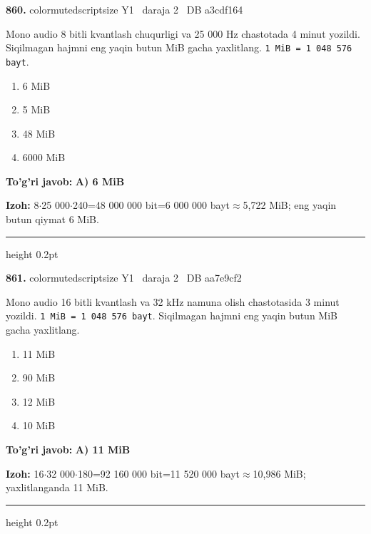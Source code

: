 \documentclass[10pt,a4paper,oneside]{article}
\begin{document}
\noindent\textbf{\color{ink}860.}  {color{muted}scriptsize Y1 \textbullet\ daraja 2 \textbullet\ DB a3cdf164}
\par
Mono audio 8 bitli kvantlash chuqurligi va 25 000 Hz chastotada 4 minut yozildi. Siqilmagan hajmni eng yaqin butun MiB gacha yaxlitlang. \texttt{1 MiB = 1 048 576 bayt}.
\begin{enumerate}[label=\Alph*),leftmargin=9mm]
\item 6 MiB
\item 5 MiB
\item 48 MiB
\item 6000 MiB
\end{enumerate}
\begin{tcolorbox}[enhanced,breakable,colback=teal!4,colframe=teal!50!black,boxrule=0.5pt,arc=1.1mm,left=3mm,right=3mm,top=1.7mm,bottom=1.7mm,before skip=2mm,after skip=2mm]
\textbf{\color{teal}To'g'ri javob:} \textbf{A) 6 MiB}
\par\smallskip
\textbf{Izoh:} 8\ensuremath{\cdot}25 000\ensuremath{\cdot}240=48 000 000 bit=6 000 000 bayt\ensuremath{\approx}5,722 MiB; eng yaqin butun qiymat 6 MiB.
\end{tcolorbox}
\vspace{2mm}\hrule height 0.2pt \vspace{3mm}

\noindent\textbf{\color{ink}861.}  {color{muted}scriptsize Y1 \textbullet\ daraja 2 \textbullet\ DB aa7e9cf2}
\par
Mono audio 16 bitli kvantlash va 32 kHz namuna olish chastotasida 3 minut yozildi. \texttt{1 MiB = 1 048 576 bayt}. Siqilmagan hajmni eng yaqin butun MiB gacha yaxlitlang.
\begin{enumerate}[label=\Alph*),leftmargin=9mm]
\item 11 MiB
\item 90 MiB
\item 12 MiB
\item 10 MiB
\end{enumerate}
\begin{tcolorbox}[enhanced,breakable,colback=teal!4,colframe=teal!50!black,boxrule=0.5pt,arc=1.1mm,left=3mm,right=3mm,top=1.7mm,bottom=1.7mm,before skip=2mm,after skip=2mm]
\textbf{\color{teal}To'g'ri javob:} \textbf{A) 11 MiB}
\par\smallskip
\textbf{Izoh:} 16\ensuremath{\cdot}32 000\ensuremath{\cdot}180=92 160 000 bit=11 520 000 bayt\ensuremath{\approx}10,986 MiB; yaxlitlanganda 11 MiB.
\end{tcolorbox}
\vspace{2mm}\hrule height 0.2pt \vspace{3mm}
\end{document}
